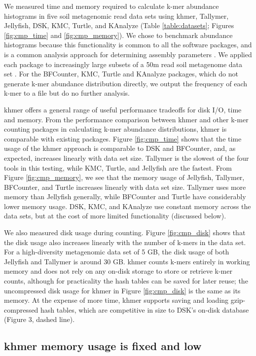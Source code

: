 We measured time and memory required to calculate k-mer abundance
histograms in five soil metagenomic read data sets using khmer,
Tallymer, Jellyfish, DSK, KMC, Turtle, and KAnalyze (Table
\ref{table:datasets}; Figures \ref{fig:cmp_time} and
\ref{fig:cmp_memory}).  We chose to benchmark abundance histograms
because this functionality is common to all the software packages, and
is a common analysis approach for determining assembly parameters
\cite{Chikhi:2014aa}.  We applied each package to increasingly large
subsets of a 50m read soil metagenome data set \cite{Howe2012}. For
the BFCounter, KMC, Turtle and KAnalyze packages, which do not
generate k-mer abundance distribution directly, we output the
frequency of each k-mer to a file but do no further analysis.


khmer offers a general range of useful
performance tradeoffs for disk I/O, time and memory.  From the
performance comparison between khmer and other k-mer counting packages
in calculating k-mer abundance distributions, khmer is comparable with
existing packages. Figure \ref{fig:cmp_time} shows that the time usage of the khmer
approach is comparable to DSK and BFCounter, and, as expected,
increases linearly with data set size. Tallymer is the slowest of the
four tools in this testing, while KMC, Turtle, and Jellyfish are
the fastest. 
From Figure \ref{fig:cmp_memory}, we see that the memory usage of
Jellyfish, Tallymer, BFCounter, and Turtle increases linearly with
data set size. Tallymer uses more memory than Jellyfish generally,
while BFCounter and Turtle have considerably lower memory usage.
DSK, KMC, and KAnalyze use constant memory across the data sets, but
at the cost of more limited functionality (discussed below).

We also measured disk usage during counting.  Figure
\ref{fig:cmp_disk} shows that the disk usage also increases linearly
with the number of k-mers in the data set.  For a high-diversity
metagenomic data set of 5 GB, the disk usage of both Jellyfish and
Tallymer is around 30 GB.  khmer counts k-mers entirely in working
memory and does not rely on any on-disk storage to store or retrieve
k-mer counts, although for practicality the hash tables can be saved
for later reuse; the uncompressed disk usage for khmer in Figure
\ref{fig:cmp_disk} is the same as its memory.  At the expense of more
time, khmer supports saving and loading gzip-compressed hash tables,
which are competitive in size to DSK's on-disk database (Figure 3,
dashed line).


\subsection{khmer memory usage is fixed and low}

